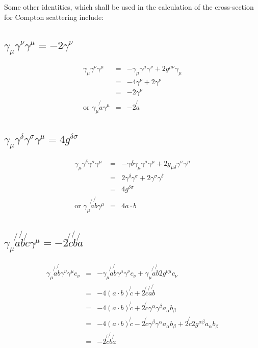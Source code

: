 Some other identities, which shall be used in the calculation of the cross-section for Compton scattering include:

\subsection{\texorpdfstring{$\gamma_{\mu}\gamma^{\nu}\gamma^{\mu} = -2\gamma^{\nu}$}{GMuGNuGMu}}

\begin{eqnarray*}
  \gamma_{\mu}\gamma^{\nu}\gamma^{\mu} & = & -\gamma_{\mu}\gamma^{\mu}\gamma^{\nu} + 2g^{\mu\nu}\gamma_{\mu} \\
  & = & -4\gamma^{\nu} + 2\gamma^{\nu} \\
  & = & -2\gamma^{\nu} \\
  \textrm{or } \gamma_{\mu}\not{a}\gamma^{\mu} & = & -2\not{a}
\end{eqnarray*}

\subsection{\texorpdfstring{$\gamma_{\mu}\gamma^{\delta}\gamma^{\sigma}\gamma^{\mu} = 4 g^{\delta\sigma}$}{GMuGDeltaGSigmaGMu}}

\begin{eqnarray*}
  \gamma_{\mu}\gamma^{\delta}\gamma^{\sigma}\gamma^{\mu} & = & -\gamma{\delta}\gamma_{\mu}\gamma^{\sigma}\gamma^{\mu} + 2g_{\mu\delta}\gamma^{\sigma}\gamma^{\mu} \\
  & = & 2\gamma^{\delta}\gamma^{\sigma} + 2\gamma^{\sigma}\gamma^{\delta} \\
  & = & 4g^{\delta\sigma} \\
  \textrm{or } \gamma_{\mu}\not{a}\not{b}\gamma^{\mu} & = & 4 a\cdot b
\end{eqnarray*}

\subsection{\texorpdfstring{$\gamma_{\mu}\not{a}\not{b}\not{c}\gamma^{\mu} = -2\not{c}\not{b}\not{a}$}{GMuNotANotBNotCGMu}}

\begin{eqnarray*}
  \gamma_{\mu}\not{a}\not{b}\gamma^{\nu}\gamma^{\mu}c_{\nu} & = & -\gamma_{\mu}\not{a}\not{b}\gamma^{\mu}\gamma^{\nu}c_{\nu} + \gamma_{\mu}\not{a}\not{b}2g^{\nu\mu}c_{\nu} \\
  & = & -4(a\cdot b) \not{c} + 2\not{c}\not{a}\not{b} \\
  & = & -4(a\cdot b) \not{c} + 2\not{c}\gamma^{\alpha}\gamma^{\beta}a_{\alpha}b_{\beta} \\
  & = & -4(a\cdot b) \not{c} - 2\not{c}\gamma^{\beta}\gamma^{\alpha}a_{\alpha}b_{\beta} + 2\not{c}2g^{\alpha\beta}a_{\alpha}b_{\beta} \\
  & = & -2\not{c}\not{b}\not{a}
\end{eqnarray*}

